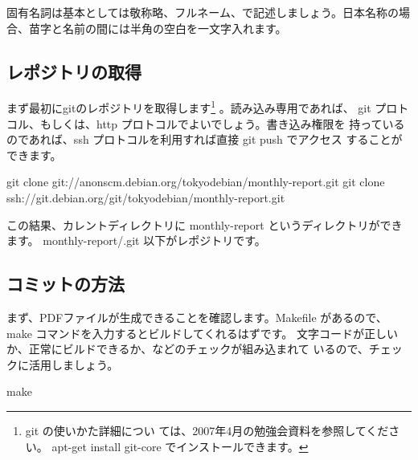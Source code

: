 \documentclass[mingoth,a4paper]{jsarticle}
\begin{document}
固有名詞は基本としては敬称略、フルネーム、で記述しましょう。日本名称の場
合、苗字と名前の間には半角の空白を一文字入れます。

\subsection{レポジトリの取得}

まず最初にgitのレポジトリを取得します\footnote{git の使いかた詳細につい
ては、2007年4月の勉強会資料を参照してください。 apt-get install git-core
でインストールできます。} 。読み込み専用であれば、
git プロトコル、もしくは、http プロトコルでよいでしょう。書き込み権限を
持っているのであれば、ssh プロトコルを利用すれば直接 git push でアクセス
することができます。

\begin{commandline}
 git clone git://anonscm.debian.org/tokyodebian/monthly-report.git
 git clone ssh://git.debian.org/git/tokyodebian/monthly-report.git
\end{commandline}

この結果、カレントディレクトリに monthly-report というディレクトリができ
ます。
monthly-report/.git 以下がレポジトリです。


\subsection{コミットの方法}

まず、PDFファイルが生成できることを確認します。Makefile があるので、make 
コマンドを入力するとビルドしてくれるはずです。
文字コードが正しいか、正常にビルドできるか、などのチェックが組み込まれて
いるので、チェックに活用しましょう。

\begin{commandline}
 make
\end{commandline}
\end{document}
